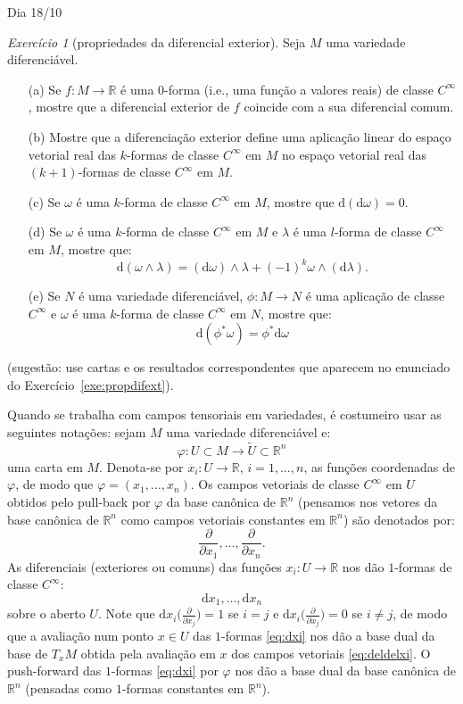 \documentclass[oneside,11pt]{amsart}
\newcommand{\R}{\mathds R}
\newcommand{\dd}{\mathrm d}
\theoremstyle{remark}\newtheorem{exercise}{Exercício}[section]
\theoremstyle{plain}\newtheorem{teo}{Teorema}[section]
\theoremstyle{plain}\newtheorem{lem}[teo]{Lema}
\theoremstyle{plain}\newtheorem{prop}[teo]{Proposição}
\theoremstyle{definition}\newtheorem{defin}[teo]{Definição}
\theoremstyle{remark}\newtheorem{rem}[teo]{Observação}
\theoremstyle{definition}\newtheorem{example}[teo]{Exemplo}
\numberwithin{equation}{section}
\begin{document}
\begin{section}{Dia 18/10}
\begin{exercise}[propriedades da diferencial exterior]\label{exe:propdifextvar}
Seja $M$ uma variedade diferenciável.
\begin{itemize}
\item[(a)] Se $f:M\to\R$ é uma $0$-forma (i.e., uma função a valores reais) de classe $C^\infty$, mostre que a diferencial exterior de $f$ coincide
com a sua diferencial comum.
\item[(b)] Mostre que a diferenciação exterior define uma aplicação linear do espaço vetorial real das $k$-formas de classe $C^\infty$ em $M$ no espaço
vetorial real das $(k+1)$-formas de classe $C^\infty$ em $M$.
\item[(c)] Se $\omega$ é uma $k$-forma de classe $C^\infty$ em $M$, mostre que $\dd(\dd\omega)=0$.
\item[(d)] Se $\omega$ é uma $k$-forma de classe $C^\infty$ em $M$ e $\lambda$ é uma $l$-forma de classe $C^\infty$ em $M$, mostre que:
\[\dd(\omega\wedge\lambda)=(\dd\omega)\wedge\lambda+(-1)^k\omega\wedge(\dd\lambda).\]
\item[(e)] Se $N$ é uma variedade diferenciável, $\phi:M\to N$ é uma aplicação de classe $C^\infty$
e $\omega$ é uma $k$-forma de classe $C^\infty$ em $N$, mostre que:
\[\dd(\phi^*\omega)=\phi^*\dd\omega\]
\end{itemize}
(sugestão: use cartas e os resultados correspondentes que aparecem no enunciado do Exercício~\ref{exe:propdifext}).
\end{exercise}

Quando se trabalha com campos tensoriais em variedades, é costumeiro usar as seguintes notações: sejam $M$ uma variedade
diferenciável e:
\[\varphi:U\subset M\longrightarrow\widetilde U\subset\R^n\]
uma carta em $M$. Denota-se por $x_i:U\to\R$, $i=1,\ldots,n$, as funções
coordenadas de $\varphi$, de modo que $\varphi=(x_1,\ldots,x_n)$. Os campos vetoriais de classe $C^\infty$ em $U$ obtidos pelo pull-back
por $\varphi$ da base canônica de $\R^n$ (pensamos nos vetores da base canônica de $\R^n$ como campos vetoriais constantes em $\R^n$) são denotados por:
\begin{equation}\label{eq:deldelxi}
\frac{\partial}{\partial x_1},\ldots,\frac{\partial}{\partial x_n}.
\end{equation}
As diferenciais (exteriores ou comuns) das funções $x_i:U\to\R$ nos dão $1$-formas de classe $C^\infty$:
\begin{equation}\label{eq:dxi}
\dd x_1,\ldots,\dd x_n
\end{equation}
sobre o aberto $U$. Note que $\dd x_i\big(\frac{\partial}{\partial x_j}\big)=1$ se $i=j$ e $\dd x_i\big(\frac{\partial}{\partial x_j}\big)=0$ se
$i\ne j$, de modo que a avaliação num ponto $x\in U$ das $1$-formas \eqref{eq:dxi} nos dão a base dual da base de $T_xM$ obtida pela avaliação em $x$
dos campos vetoriais \eqref{eq:deldelxi}. O push-forward das $1$-formas \eqref{eq:dxi} por $\varphi$ nos dão a base dual da base canônica de $\R^n$
(pensadas como $1$-formas constantes em $\R^n$).


\end{section}
\end{document}
